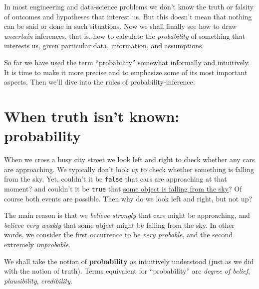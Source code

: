 \documentclass[
  a4paper,
  DIV=11,
  numbers=noendperiod,
  oneside]{scrreprt}
\begin{document}
\providecommand*{\mo}[1][=]{\mathord{\,#1\,}}
\providecommand*{\yX}{\se{X}}
\providecommand*{\yY}{\se{Y}}
\providecommand*{\yI}{\se{I}}
\providecommand*{\yi}[1][]{\se{I}_{\text{#1}}}
\providecommand{\di}{\mathrm{d}}

\providecommand*{\ys}{\se{s}}
\providecommand*{\yh}{\se{h}}
\providecommand*{\yf}{\se{f}}
\providecommand*{\yJ}{\se{J}}
\providecommand*{\yZ}{\se{Z}}
\providecommand*{\yH}{\se{H}}

In most engineering and data-science problems we don't know the truth or
falsity of outcomes and hypotheses that interest us. But this doesn't
mean that nothing can be said or done in such situations. Now we shall
finally see how to draw \emph{uncertain} inferences, that is, how to
calculate the \emph{probability} of something that interests us, given
particular data, information, and assumptions.

So far we have used the term ``probability'' somewhat informally and
intuitively. It is time to make it more precise and to emphasize some of
its most important aspects. Then we'll dive into the rules of
probability-inference.

\hypertarget{sec-probability-def}{%
\section{When truth isn't known:
probability}\label{sec-probability-def}}

When we cross a busy city street we look left and right to check whether
any cars are approaching. We typically don't look \emph{up} to check
whether something is falling from the sky. Yet, couldn't it be
\texttt{false} that cars are approaching at that moment? and couldn't it
be \texttt{true} that
\href{https://www.aerotime.aero/articles/32818-cessna-door-falls-off-lands-in-parking-lot}{some
object is falling from the sky}? Of course both events are possible.
Then why do we look left and right, but not up?

The main reason is that we \emph{believe strongly} that cars might be
approaching, and \emph{believe very weakly} that some object might be
falling from the sky. In other words, we consider the first occurrence
to be \emph{very probable}, and the second extremely \emph{improbable}.

We shall take the notion of {\textbf{probability}} as intuitively
understood (just as we did with the notion of truth). Terms equivalent
for ``probability'' are {\emph{degree of belief}},
{\emph{plausibility}}, {\emph{credibility}}.
\end{document}
